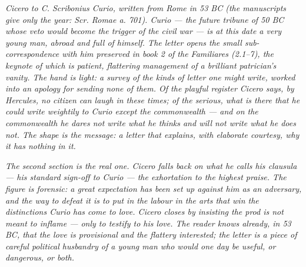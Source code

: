 
\textit{Cicero to C. Scribonius Curio, written from Rome in 53
BC (the manuscripts give only the year: \textit{Scr. Romae a. 701}).
Curio --- the future tribune of 50 BC whose veto would
become the trigger of the civil war --- is at this date a very
young man, abroad and full of himself. The letter opens the
small sub-correspondence with him preserved in book 2 of the
\textit{Familiares} (2.1--7), the keynote of which is patient,
flattering management of a brilliant patrician's vanity. The
hand is light: a survey of the kinds of letter one might write,
worked into an apology for sending none of them. Of the playful
register Cicero says, by Hercules, no citizen can laugh in these
times; of the serious, what is there that he could write
weightily to Curio except the commonwealth --- and on the
commonwealth he dares not write what he thinks and will not
write what he does not. The shape is the message: a letter
that explains, with elaborate courtesy, why it has nothing in it.}

\textit{The second section is the real one. Cicero falls back
on what he calls his \textit{clausula} --- his standard sign-off
to Curio --- the exhortation to the highest praise. The figure
is forensic: a great expectation has been set up against him
as an adversary, and the way to defeat it is to put in the
labour in the arts that win the distinctions Curio has come to
love. Cicero closes by insisting the prod is not meant to
inflame --- only to testify to his love. The reader knows
already, in 53 BC, that the love is provisional and the
flattery interested; the letter is a piece of careful
political husbandry of a young man who would one day be
useful, or dangerous, or both.}
